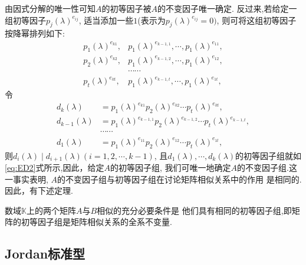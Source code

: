 \begin{definition}
  由因式分解的唯一性可知$A$的初等因子被$A$的不变因子唯一确定.
  反过来,若给定一组初等因子$p_j(\lambda)^{e_{ij}}$,
  适当添加一些$1$(表示为$p_j(\lambda)^{e_{ij}}=0)$,
  则可将这组初等因子按降幂排列如下:
  \begin{equation}\label{eq:ED2}
    \begin{split}
      p_1(\lambda)^{e_{k1}},&  p_1(\lambda)^{e_{k-1,1}}, \cdots, p_1(\lambda)^{e_{11}},\\
      p_2(\lambda)^{e_{k2}},&  p_1(\lambda)^{e_{k-1,2}}, \cdots, p_1(\lambda)^{e_{12}},\\
      & \cdots\cdots\\
      p_t(\lambda)^{e_{kt}},&  p_1(\lambda)^{e_{k-1,t}}, \cdots, p_1(\lambda)^{e_{1t}},
    \end{split}
  \end{equation}
  令
  \begin{equation*}
    \begin{split}
      d_k(\lambda) & = p_1(\lambda)^{e_{k1}}p_2(\lambda)^{e_{k2}}\cdots p_t(\lambda)^{e_{kt}},\\
      d_{k-1}(\lambda) & = p_1(\lambda)^{e_{k-1,1}}p_2(\lambda)^{e_{k-1,2}}\cdots p_t(\lambda)^{e_{k-1,t}},\\
                   & \cdots\cdots\\
      d_1(\lambda) & = p_1(\lambda)^{e_{11}}p_2(\lambda)^{e_{12}}\cdots p_t(\lambda)^{e_{1t}},
    \end{split}
  \end{equation*}
  则$d_i(\lambda)\mid d_{i+1}(\lambda)(i=1,2,\cdots,k-1)$,
  且$d_1(\lambda),\cdots,d_k(\lambda)$的初等因子组就如
  \eqref{eq:ED2}式所示,因此，给定$A$的初等因子组,
  我们可唯一地确定$A$的不变因子组.这一事实表明,
  $A$的不变因子组与初等因子组在讨论矩阵相似关系中的作用
  是相同的.因此，有下述定理.
\end{definition}
\begin{theorem}
  数域$\mathbb{K}$上的两个矩阵$A$与$B$相似的充分必要条件是
  他们具有相同的初等因子组,即矩阵的初等因子组是矩阵相似关系的全系不变量.
\end{theorem}

\subsection{Jordan标准型}

